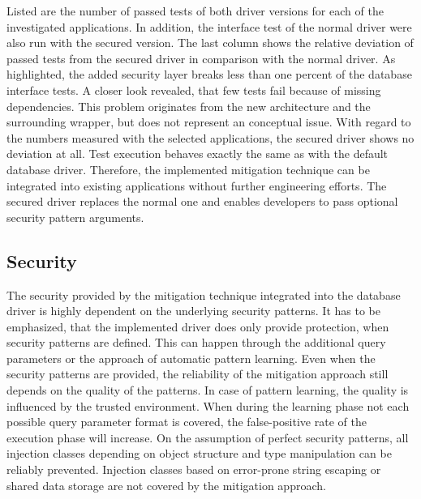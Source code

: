 Listed are the number of passed tests of both driver versions for each of the investigated applications. In addition, the interface test of the normal driver were also run with the secured version. The last column shows the relative deviation of passed tests from the secured driver in comparison with the normal driver. As highlighted, the added security layer breaks less than one percent of the database interface tests. A closer look revealed, that few tests fail because of missing dependencies. This problem originates from the new architecture and the surrounding wrapper, but does not represent an conceptual issue. With regard to the numbers measured with the selected applications, the secured driver shows no deviation at all. Test execution behaves exactly the same as with the default database driver. Therefore, the implemented mitigation technique can be integrated into existing applications without further engineering efforts. The secured driver replaces the normal one and enables developers to pass optional security pattern arguments. 

\subsection{Security}
The security provided by the mitigation technique integrated into the database driver is highly dependent on the underlying security patterns. It has to be emphasized, that the implemented driver does only provide protection, when security patterns are defined. This can happen through the additional query parameters or the approach of automatic pattern learning. Even when the security patterns are provided, the reliability of the mitigation approach still depends on the quality of the patterns. In case of pattern learning, the quality is influenced by the trusted environment. When during the learning phase not each possible query parameter format is covered, the false-positive rate of the execution phase will increase. On the assumption of perfect security patterns, all injection classes depending on object structure and type manipulation can be reliably prevented. Injection classes based on error-prone string escaping or shared data storage are not covered by the mitigation approach.